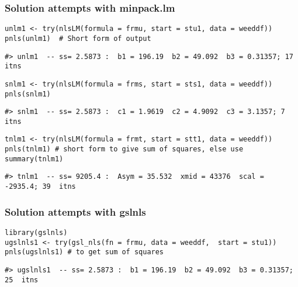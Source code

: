 \hypertarget{solution-attempts-with-minpack.lm}{%
\subsubsection{Solution attempts with minpack.lm}\label{solution-attempts-with-minpack.lm}}

\begin{verbatim}
unlm1 <- try(nlsLM(formula = frmu, start = stu1, data = weeddf))
pnls(unlm1)  # Short form of output
\end{verbatim}

\begin{verbatim}
#> unlm1  -- ss= 2.5873 :  b1 = 196.19  b2 = 49.092  b3 = 0.31357; 17  itns
\end{verbatim}

\begin{verbatim}
snlm1 <- try(nlsLM(formula = frms, start = sts1, data = weeddf))
pnls(snlm1)
\end{verbatim}

\begin{verbatim}
#> snlm1  -- ss= 2.5873 :  c1 = 1.9619  c2 = 4.9092  c3 = 3.1357; 7  itns
\end{verbatim}

\begin{verbatim}
tnlm1 <- try(nlsLM(formula = frmt, start = stt1, data = weeddf))
pnls(tnlm1) # short form to give sum of squares, else use summary(tnlm1)
\end{verbatim}

\begin{verbatim}
#> tnlm1  -- ss= 9205.4 :  Asym = 35.532  xmid = 43376  scal = -2935.4; 39  itns
\end{verbatim}

\hypertarget{solution-attempts-with-gslnls}{%
\subsubsection{Solution attempts with gslnls}\label{solution-attempts-with-gslnls}}

\begin{verbatim}
library(gslnls)
ugslnls1 <- try(gsl_nls(fn = frmu, data = weeddf,  start = stu1))
pnls(ugslnls1) # to get sum of squares
\end{verbatim}

\begin{verbatim}
#> ugslnls1  -- ss= 2.5873 :  b1 = 196.19  b2 = 49.092  b3 = 0.31357; 25  itns
\end{verbatim}

